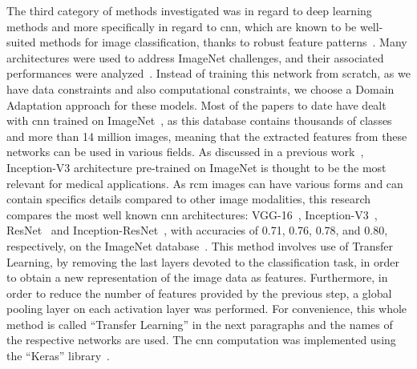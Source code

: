 \documentclass[journal,article,accept,moreauthors,pdftex, applsci]{Definitions/mdpi}
\begin{document}
The third category of methods investigated was in regard to deep learning methods and more specifically in regard to \ac{cnn}, which are known to be well-suited methods for image classification, thanks to robust feature patterns~\cite{Pathan2018}. Many architectures were used to address ImageNet challenges, and their associated performances were analyzed~\cite{Canziani2016}. Instead of training this network from scratch, as we have data constraints and also computational constraints, we choose a Domain Adaptation approach for these models. Most of the papers to date have dealt with \ac{cnn} trained on ImageNet~\cite{Deng2008}, as this database contains thousands of classes and more than 14 million images, meaning that the extracted features from these networks can be used in various fields. As discussed in a previous work~\cite{Litjens2017}, Inception-V3 architecture pre-trained on ImageNet is thought to be the most relevant for medical applications. As \ac{rcm} images can have various forms and can contain specifics details compared to other image modalities, this research compares the most well known \ac{cnn} architectures: VGG-16~\cite{Simonyan2014}, Inception-V3~\cite{Szegedy2015}, ResNet~\cite{He2016} and Inception-ResNet~\cite{Szegedy2017}, with accuracies of 0.71, 0.76, 0.78, and 0.80, respectively, on the ImageNet database~\cite{Canziani2016}. This method involves use of Transfer Learning, by removing the last layers devoted to the classification task, in order to obtain a new representation of the image data as features. Furthermore, in order to reduce the number of features provided by the previous step, a global pooling layer on each activation layer was performed. For convenience, this whole method is called “Transfer Learning” in the next paragraphs and the names of the respective networks are used. The \ac{cnn} computation was implemented using the “Keras” library~\cite{chollet2015keras}.\par

\end{document}
